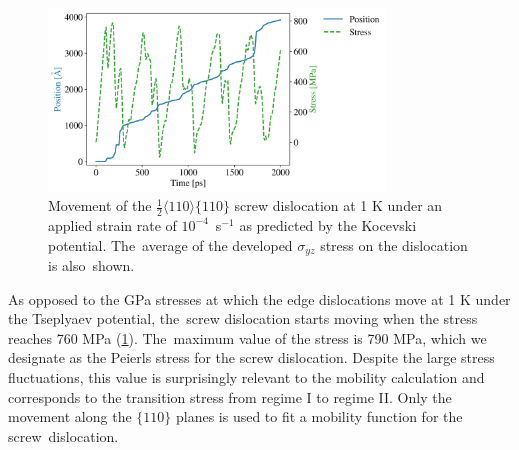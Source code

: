\documentclass[applsci,article,accept,pdftex,moreauthors]{Definitions/mdpi}
\newcommand{\?}{\stackrel{?}{=}}
\begin{document}
%
%



\begin{figure}[H]
    \includegraphics[width=0.8\textwidth]{Position-Stress-ScrewEAM110.png}
    \caption{Movement of the $\frac{1}{2} \langle 110 \rangle \{110\}$ screw dislocation at 1 K under an applied strain rate of \mbox{$10^{-4}$ s$^{-1}$} as predicted by the Kocevski potential. The~average of the developed $\sigma_{yz}$ stress on the dislocation is also~shown.}
    \label{Fig:Screw1K}
\end{figure}

As opposed to the GPa stresses at which the edge dislocations move at 1 K under the Tseplyaev potential, the~screw dislocation starts moving when the stress reaches 760 MPa (\cref{Fig:Screw1K}). The~maximum value of the stress is 790 MPa, which we designate as the Peierls stress for the screw dislocation. Despite the large stress fluctuations, this value is surprisingly relevant to the mobility calculation and corresponds to the transition stress from regime I to regime II. Only the movement along the $\{110\}$ planes is used to fit a mobility function for the screw~dislocation.
\end{document}
